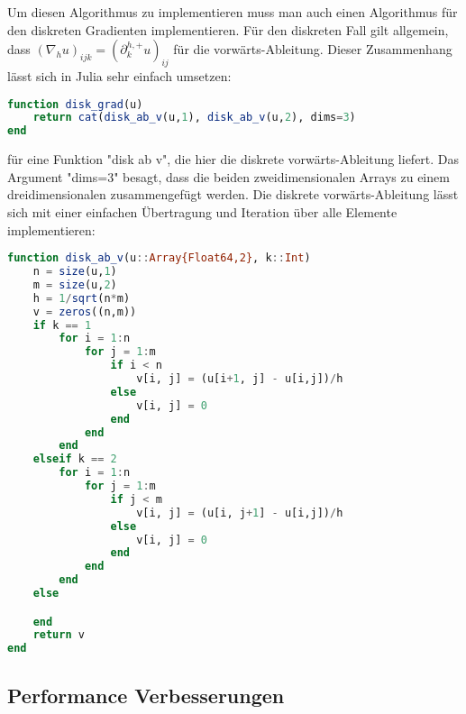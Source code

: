 \documentclass{article}
\theoremstyle{case}
\begin{document}
Um diesen Algorithmus zu implementieren muss man auch einen Algorithmus für den diskreten Gradienten implementieren. Für den diskreten Fall gilt allgemein, dass $(\nabla_{h} u)_{ijk} = ( \partial_{k}^{h,+} u)_{ij}$ für die vorwärts-Ableitung. Dieser Zusammenhang lässt sich in Julia sehr einfach umsetzen:
\begin{lstlisting}[language=Julia]
function disk_grad(u)
	return cat(disk_ab_v(u,1), disk_ab_v(u,2), dims=3)
end
\end{lstlisting}
für eine Funktion "disk ab v", die hier die diskrete vorwärts-Ableitung liefert. Das Argument "dims=3" besagt, dass die beiden zweidimensionalen Arrays zu einem dreidimensionalen zusammengefügt werden. Die diskrete vorwärts-Ableitung lässt sich mit einer einfachen Übertragung und Iteration über alle Elemente implementieren:
\begin{lstlisting}[language=Julia]
function disk_ab_v(u::Array{Float64,2}, k::Int)
	n = size(u,1)
	m = size(u,2)
	h = 1/sqrt(n*m)
	v = zeros((n,m))
	if k == 1
		for i = 1:n
			for j = 1:m
				if i < n
					v[i, j] = (u[i+1, j] - u[i,j])/h
				else
					v[i, j] = 0
				end
			end
		end
	elseif k == 2
		for i = 1:n
			for j = 1:m
				if j < m
					v[i, j] = (u[i, j+1] - u[i,j])/h
				else
					v[i, j] = 0
				end
			end
		end
	else

	end
	return v
end
\end{lstlisting}



\subsection*{Performance Verbesserungen}
\end{document}
